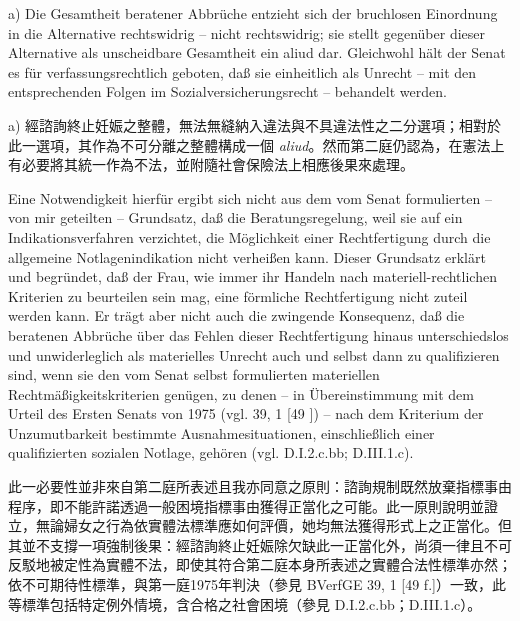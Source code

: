 \documentclass[12pt]{article}
\begin{document}
\begin{sourcepara}[title={原文SondervotumB.320}]
a) Die Gesamtheit beratener Abbrüche entzieht sich der bruchlosen Einordnung in die Alternative rechtswidrig -- nicht rechtswidrig; sie stellt gegenüber dieser Alternative als unscheidbare Gesamtheit ein aliud dar. Gleichwohl hält der Senat es für verfassungsrechtlich geboten, daß sie einheitlich als Unrecht -- mit den entsprechenden Folgen im Sozialversicherungsrecht -- behandelt werden.
\end{sourcepara}
\begin{transpara}
a) 經諮詢終止妊娠之整體，無法無縫納入違法與不具違法性之二分選項；相對於此一選項，其作為不可分離之整體構成一個 \textit{aliud}。然而第二庭仍認為，在憲法上有必要將其統一作為不法，並附隨社會保險法上相應後果來處理。
\end{transpara}

\begin{sourcepara}[title={原文SondervotumB.321}]
Eine Notwendigkeit hierfür ergibt sich nicht aus dem vom Senat formulierten -- von mir geteilten -- Grundsatz, daß die Beratungsregelung, weil sie auf ein Indikationsverfahren verzichtet, die Möglichkeit einer Rechtfertigung durch die allgemeine Notlagenindikation nicht verheißen kann. Dieser Grundsatz erklärt und begründet, daß der Frau, wie immer ihr Handeln nach materiell-rechtlichen Kriterien zu beurteilen sein mag, eine förmliche Rechtfertigung nicht zuteil werden kann. Er trägt aber nicht auch die zwingende Konsequenz, daß die beratenen Abbrüche über das Fehlen dieser Rechtfertigung hinaus unterschiedslos und unwiderleglich als materielles Unrecht auch und selbst dann zu qualifizieren sind, wenn sie den vom Senat selbst formulierten materiellen Rechtmäßigkeitskriterien genügen, zu denen -- in Übereinstimmung mit dem Urteil des Ersten Senats von 1975 (vgl. \abbrBVerfGE{} 39, 1 [49 \abbrF{}]) -- nach dem Kriterium der Unzumutbarkeit bestimmte Ausnahmesituationen, einschließlich einer qualifizierten sozialen Notlage, gehören (vgl. D.I.2.c.bb; D.III.1.c).
\end{sourcepara}
\begin{transpara}
此一必要性並非來自第二庭所表述且我亦同意之原則：諮詢規制既然放棄指標事由程序，即不能許諾透過一般困境指標事由獲得正當化之可能。此一原則說明並證立，無論婦女之行為依實體法標準應如何評價，她均無法獲得形式上之正當化。但其並不支撐一項強制後果：經諮詢終止妊娠除欠缺此一正當化外，尚須一律且不可反駁地被定性為實體不法，即使其符合第二庭本身所表述之實體合法性標準亦然；依不可期待性標準，與第一庭1975年判決（參見 BVerfGE 39, 1 [49 f.]）一致，此等標準包括特定例外情境，含合格之社會困境（參見 D.I.2.c.bb；D.III.1.c）。
\end{transpara}
\end{document}
